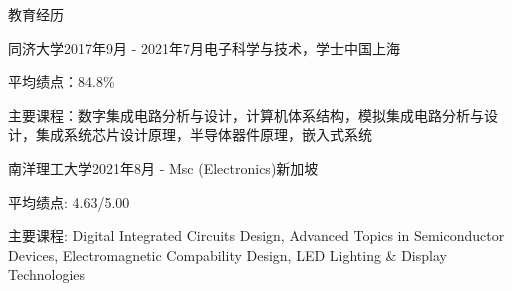 \documentclass{resume} %
\begin{document}

\begin{rSection}{教育经历}
	
	\begin{rSubsection}{同济大学}{2017年9月 - 2021年7月}{电子科学与技术，学士}{中国上海}
		\item 平均绩点：84.8\% 
		\item 主要课程：数字集成电路分析与设计，计算机体系结构，模拟集成电路分析与设计，集成系统芯片设计原理，半导体器件原理，嵌入式系统
	\end{rSubsection}

	\begin{rSubsection}{南洋理工大学}{2021年8月 - }{Msc (Electronics)}{新加坡}
		\item 平均绩点: 4.63/5.00
		\item 主要课程: Digital Integrated Circuits Design, Advanced Topics in Semiconductor Devices, Electromagnetic Compability Design, LED Lighting \& Display Technologies
	\end{rSubsection}

\end{rSection}
\end{document}
